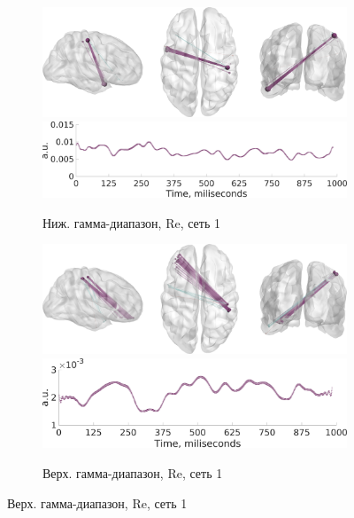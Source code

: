 \begin{figure}
\centering
{}

 \begin{subfigure}[b]{0.4\textwidth}
 \includegraphics[width=\textwidth]{../images/psiicos_paper/Figure13_a1.jpg}
 \includegraphics[width=\textwidth]{../images/psiicos_paper/Figure13_a2.jpg}
 \caption{Ниж. гамма-диапазон, Re, сеть 1}\label{fig:13a}
 \end{subfigure}
 \hspace{1cm}
 \begin{subfigure}[b]{0.4\textwidth}
 \includegraphics[width=\textwidth]{../images/psiicos_paper/Figure13_b1.jpg}
 \includegraphics[width=\textwidth]{../images/psiicos_paper/Figure13_b2.jpg}
 \caption{Верх. гамма-диапазон, Re, сеть 1}\label{fig:13b}
 \end{subfigure}


\end{figure}

